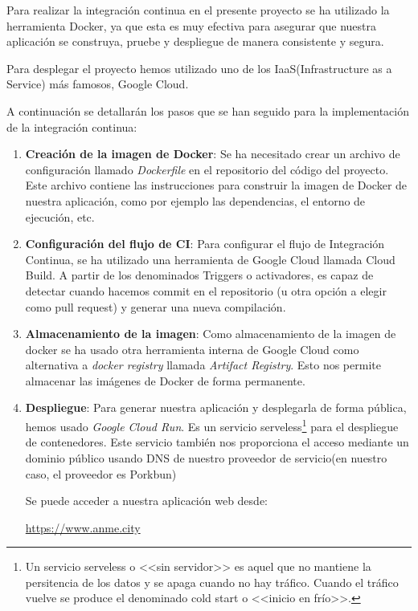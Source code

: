 Para realizar la integración continua en el presente proyecto se ha utilizado la herramienta Docker, ya que esta es muy efectiva para asegurar que nuestra aplicación se construya, pruebe y despliegue de manera consistente y segura.

Para desplegar el proyecto hemos utilizado uno de los IaaS(Infrastructure as a Service) más famosos, Google Cloud.

A continuación se detallarán los pasos que se han seguido para la implementación de la integración continua:

\begin{enumerate}
    \item \textbf{Creación de la imagen de Docker}: Se ha necesitado crear un archivo de configuración llamado \textit{Dockerfile} en el repositorio del código del proyecto. Este archivo contiene las instrucciones para construir la imagen de Docker de nuestra aplicación, como por ejemplo las dependencias, el entorno de ejecución, etc.  

    \item \textbf{Configuración del flujo de CI}: Para configurar el flujo de Integración Continua, se ha utilizado una herramienta de Google Cloud llamada Cloud Build. A partir de los denominados Triggers o activadores, es capaz de detectar cuando hacemos commit en el repositorio (u otra opción a elegir como pull request) y generar una nueva compilación.

    
    

    \item \textbf{Almacenamiento de la imagen}: Como almacenamiento de la imagen de docker se ha usado otra herramienta interna de Google Cloud como alternativa a \textit{docker registry} llamada \textit{Artifact Registry}. Esto nos permite almacenar las imágenes de Docker de forma permanente.
    
    \item \textbf{Despliegue}: Para generar nuestra aplicación y desplegarla de forma pública, hemos usado \textit{Google Cloud Run}. Es un servicio serveless\footnote{Un servicio serveless o <<sin servidor>> es aquel que no mantiene la persitencia de los datos y se apaga cuando no hay tráfico. Cuando el tráfico vuelve se produce el denominado cold start o <<inicio en frío>>.} para el despliegue de contenedores. Este servicio también nos proporciona el acceso mediante un dominio público usando DNS de nuestro proveedor de servicio(en nuestro caso, el proveedor es Porkbun)

    \newpage
    Se puede acceder a nuestra aplicación web desde:
    
    \url{https://www.anme.city}

\end{enumerate}